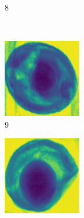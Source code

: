 \documentclass[11pt]{article}
\begin{document}
\begin{figure}[!h]
\begin{subfigure}[b]{0.22\textwidth}
         \caption{8}
         \label{fig:avo_7}
     \end{subfigure}
     \\
    \begin{subfigure}[b]{0.22\textwidth}
         \centering
         \includegraphics[width=\textwidth]{figurer/avocado_dataset/avo_8.jpg}
         \caption{9}
         \label{fig:avo_8}
     \end{subfigure}
     \hfill
     \begin{subfigure}[b]{0.22\textwidth}
         \centering
         \includegraphics[width=\textwidth]{figurer/avocado_dataset/avo_9.jpg}

\end{subfigure}
\end{figure}
\end{document}
